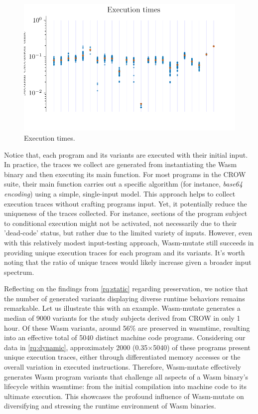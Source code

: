 \documentclass[sigplan,screen]{acmart}
\newcommand{\tool}{Wasm-mutate\xspace}
\newcommand{\wasm}{Wasm\xspace}
\begin{document}
\begin{figure}
    \centering
    \includegraphics[width=0.8\linewidth]{plots/rq2/times.pdf}
    \caption{Execution times.}
  \label{rq2:plot:execution_times}
\end{figure}

Notice that, each program and its variants are executed with their initial input.
In practice, the traces we collect are generated from instantiating the \wasm binary and then executing its main function. 
For most programs in the CROW suite, their main function carries out a specific algorithm (for instance, \emph{base64 encoding}) using a simple, single-input model. 
This approach helps to collect execution traces without crafting programs input.
Yet, it potentially reduce the uniqueness of the traces collected. 
For instance, sections of the program subject to conditional execution might not be activated, not necessarily due to their 'dead-code' status, but rather due to the limited variety of inputs. 
However, even with this relatively modest input-testing approach, \tool still succeeds in providing unique execution traces for each program and its variants.
It's worth noting that the ratio of unique traces would likely increase given a broader input spectrum.

Reflecting on the findings from \ref{rq:static} regarding preservation, we notice that the number of generated variants displaying diverse runtime behaviors remains remarkable. 
Let us illustrate this with an example.
\tool generates a median of 9000 variants for the study subjects derived from CROW in only 1 hour. 
Of these \wasm variants, around 56\% are preserved in wasmtime, resulting into an effective total of 5040 distinct machine code programs.
Considering our data in \ref{rq:dynamic}, approximately 2000 (0.35$\times$5040) of these programs present unique execution traces, either through differentiated memory accesses or the overall variation in executed instructions. 
Therefore, \tool effectively generates \wasm program variants that challenge all aspects of a \wasm binary's lifecycle within wasmtime: from the initial compilation into machine code to its ultimate execution. 
This showcases the profound influence of \tool on diversifying and stressing the runtime environment of \wasm binaries.
\end{document}
